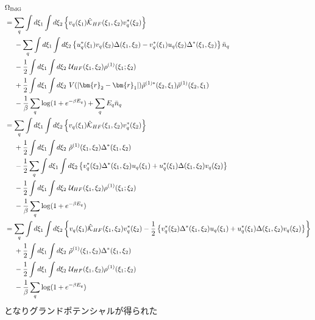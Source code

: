 \documentclass[dvipdfmx, 11pt, a4paper]{jsarticle}
\numberwithin{equation}{section}
\theoremstyle{definition}
\begin{document}
\begin{derivationBox}
\begin{align}
            &\Omega_{\mathrm{BdG}} \notag \\
            &=\sum_q\int d\xi_1 \int d\xi_2 \left\{  v_q(\xi_1)\hat{\mathcal{K}}_{HF}(\xi_1,\xi_2)v_q^*(\xi_2) \right\}   \notag \\
            &\ \ \ \ -\sum_q  \int d\xi_1 \int d\xi_2 \left\{    u_q^*(\xi_1) v_q(\xi_2)\Delta (\xi_1,\xi_2)   -    v^*_q(\xi_1)u_q(\xi_2)\Delta^* (\xi_1,\xi_2) \right\}\bar{n}_q    \notag \\
            &\ \ \ \ - \frac{1}{2}\int d\xi_1\int d\xi_2\ \mathcal{U}_{HF}(\xi_1,\xi_2)\rho^{(1)}(\xi_1;\xi_2) \notag \\
            &\ \ \ \ +\frac{1}{2}\int d\xi_1\int d\xi_2\ V(\left| \bm{r}_2-\bm{r}_1 \right|) \tilde{\rho}^{(1)*}(\xi_2,\xi_1) \tilde{\rho}^{(1)}(\xi_2,\xi_1) \notag \\
            &\ \ \ \ -\frac{1}{\beta} \sum_q \log (1 + e^{-\beta E_q}) + \sum_q E_q\bar{n}_q \notag \\
            &=\sum_q\int d\xi_1 \int d\xi_2 \left\{  v_q(\xi_1)\hat{\mathcal{K}}_{HF}(\xi_1,\xi_2)v_q^*(\xi_2) \right\}   \notag \\
            &\ \ \ \ + \frac{1}{2} \int d\xi_1 \int d\xi_2\ \tilde{\rho}^{(1)}(\xi_1,\xi_2)\Delta^* (\xi_1,\xi_2) \notag \\
            &\ \ \ \ - \frac{1}{2}\sum_q \int d\xi_1 \int d\xi_2 \left\{v^*_q(\xi_2)\Delta^* (\xi_1,\xi_2)   u_q(\xi_1) +  u_q^*(\xi_1)\Delta(\xi_1,\xi_2)v_q(\xi_2) \right\} \notag \\
            &\ \ \ \ - \frac{1}{2}\int d\xi_1\int d\xi_2\ \mathcal{U}_{HF}(\xi_1,\xi_2)\rho^{(1)}(\xi_1;\xi_2) \notag \\
            &\ \ \ \ -\frac{1}{\beta} \sum_q \log (1 + e^{-\beta E_q})  \notag \\
            &=\sum_q\int d\xi_1 \int d\xi_2 \left\{  v_q(\xi_1)\hat{\mathcal{K}}_{HF}(\xi_1,\xi_2)v_q^*(\xi_2) -\frac{1}{2}\left\{v^*_q(\xi_2)\Delta^* (\xi_1,\xi_2)   u_q(\xi_1) +  u_q^*(\xi_1)\Delta(\xi_1,\xi_2)v_q(\xi_2) \right\}\right\}   \notag \\
            &\ \ \ \ + \frac{1}{2} \int d\xi_1 \int d\xi_2\ \tilde{\rho}^{(1)}(\xi_1,\xi_2)\Delta^* (\xi_1,\xi_2) \notag \\
            &\ \ \ \ - \frac{1}{2}\int d\xi_1\int d\xi_2\ \mathcal{U}_{HF}(\xi_1,\xi_2)\rho^{(1)}(\xi_1;\xi_2) \notag \\
            &\ \ \ \ -\frac{1}{\beta} \sum_q \log (1 + e^{-\beta E_q}) 
        \end{align}
        となりグランドポテンシャルが得られた
    \end{derivationBox}
\end{document}
